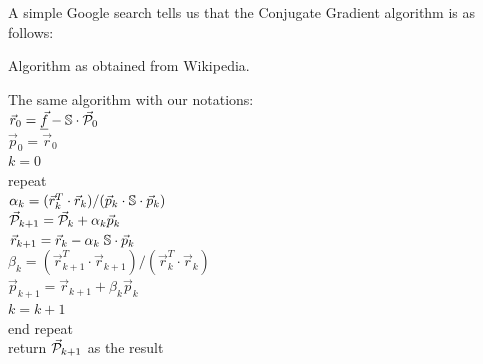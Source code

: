 A simple Google search tells us that the Conjugate Gradient algorithm is as follows:

\begin{minipage}{0.40\textwidth}
\centering
{\captionfont Algorithm as obtained from Wikipedia.}\\
\end{minipage}\hfill
\begin{minipage}{0.50\textwidth}
The same algorithm with our notations:\\
$\vec{r}_0 = \underline{\vec{f}} - {\mathbb{S}} \cdot \vec{\cal P}_0$\\
$\vec{p}_0 = \vec{r}_0$\\
$k=0$ \\
repeat\\
\hspace{8mm} $\alpha_k = (\vec{r}_k^T\cdot \vec{r}_k )/(\vec{p}_k \cdot {\mathbb{S}}\cdot  \vec{p}_k )$\\
\hspace{8mm} $\vec{\cal P}_{k+1} = \vec{\cal P}_k+\alpha_k \vec{p}_k$\\
\hspace{8mm} $\vec{r}_{k+1} = \vec{r}_k - \alpha_k \; {\mathbb{S}} \cdot \vec{p}_k $ \\
\hspace{8mm} $\beta_k=(\vec{r}_{k+1}^T \cdot \vec{r}_{k+1})/(\vec{r}_k^T \cdot \vec{r}_k)$ \\
\hspace{8mm} $\vec{p}_{k+1} =\vec{r}_{k+1}+ \beta_k \vec{p}_k$ \\
$k=k+1$ \\
end repeat\\
return $\vec{\cal P}_{k+1}$ as the result
\end{minipage}

\vspace{.5cm}

